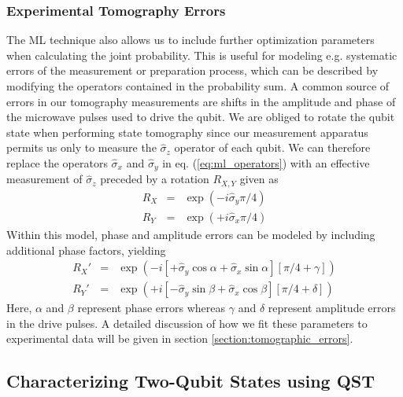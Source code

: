 \subsubsection{Experimental Tomography Errors}

The ML technique also allows us to include further optimization parameters when calculating the joint probability. This is useful for modeling e.g. systematic errors of the measurement or preparation process, which can be described by modifying the operators contained in the probability sum. A common source of errors in our tomography measurements are shifts in the amplitude and phase of the microwave pulses used to drive the qubit. We are obliged to rotate the qubit state when performing state tomography since our measurement apparatus permits us only to measure the $\hat{\sigma}_z$ operator of each qubit. We can therefore replace the operators $\hat{\sigma}_x$ and $\hat{\sigma}_y$ in eq. (\ref{eq:ml_operators}) with an effective measurement of $\hat{\sigma}_z$ preceded by a rotation $R_{X,Y}$ given as
\begin{eqnarray}
R_{X} & = & \exp{\left( -i \hat{\sigma}_y \pi / 4\right)} \\
R_{Y} & = & \exp{\left( +i \hat{\sigma}_x \pi / 4\right)} 
\end{eqnarray}
Within this model, phase and amplitude errors can be modeled by including additional phase factors, yielding
\begin{eqnarray}
R_{X}' & = & \exp{\left( -i \left[+\hat{\sigma}_y\cos{\alpha}+\hat{\sigma}_x\sin{\alpha} \right] \left[\pi / 4+\gamma\right]\right)} \\
R_{Y}' & = & \exp{\left( +i \left[-\hat{\sigma}_y\sin{\beta}+\hat{\sigma}_x\cos{\beta}\right] \left[\pi / 4+\delta\right]\right)} 
\end{eqnarray}
Here, $\alpha$ and $\beta$ represent phase errors whereas $\gamma$ and $\delta$ represent amplitude errors in the drive pulses. A detailed discussion of how we fit these parameters to experimental data will be given in section \ref{section:tomographic_errors}.

\subsection{Characterizing Two-Qubit States using QST}

